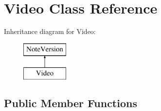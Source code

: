 \hypertarget{class_video}{}\section{Video Class Reference}
\label{class_video}
Inheritance diagram for Video\+:\begin{figure}[H]
\begin{center}
\leavevmode
\includegraphics[height=2.000000cm]{class_video}
\end{center}
\end{figure}
\subsection*{Public Member Functions}
